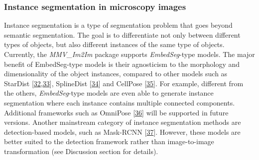 \hypertarget{instance-segmentation-in-microscopy-images}{%
\subsubsection{Instance segmentation in microscopy images}\label{instance-segmentation-in-microscopy-images}}

Instance segmentation is a type of segmentation problem that goes beyond semantic segmentation. The goal is to differentiate not only between different types of objects, but also different instances of the same type of objects. Currently, the \emph{MMV\_Im2Im} package supports \emph{EmbedSeg}-type models. The major benefit of EmbedSeg-type models is their agnosticism to the morphology and dimensionality of the object instances, compared to other models such as StarDist {[}\protect\hyperlink{ref-tIIG2f8K}{32},\protect\hyperlink{ref-14h90Vfg0}{33}{]}, SplineDist {[}\protect\hyperlink{ref-17Yrl6WGQ}{34}{]} and CellPose {[}\protect\hyperlink{ref-TugPkOLy}{35}{]}. For example, different from the others, \emph{EmbedSeg}-type models are even able to generate instance segmentation where each instance contains multiple connected components. Additional frameworks such as OmniPose {[}\protect\hyperlink{ref-lXzmjM5n}{36}{]} will be supported in future versions. Another mainstream category of instance segmentation methods are detection-based models, such as Mask-RCNN {[}\protect\hyperlink{ref-xi8wnibR}{37}{]}. However, these models are better suited to the detection framework rather than image-to-image transformation (see Discussion section for details).


